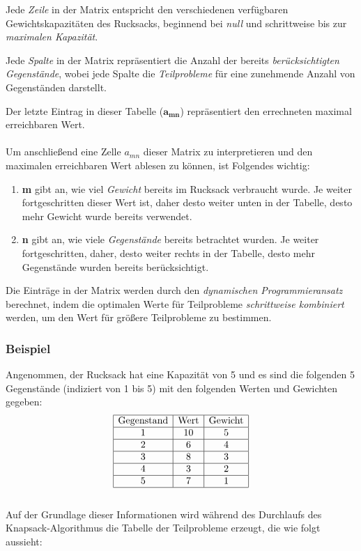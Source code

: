 Jede \textit{Zeile} in der Matrix entspricht den verschiedenen verfügbaren Gewichtskapazitäten des Rucksacks, beginnend
bei \textit{null} und schrittweise bis zur \textit{maximalen Kapazität}.

Jede \textit{Spalte} in der Matrix repräsentiert die Anzahl der bereits \textit{berücksichtigten Gegenstände}, wobei jede
Spalte die \textit{Teilprobleme} für eine zunehmende Anzahl von Gegenständen darstellt.

Der letzte Eintrag in dieser Tabelle (\textbf{$\mathbf{a_{mn}}$}) repräsentiert den errechneten maximal erreichbaren Wert.\\
\\
Um anschließend eine Zelle \( a_{mn} \) dieser Matrix zu interpretieren und den maximalen erreichbaren Wert ablesen zu können, ist Folgendes wichtig:
\begin{enumerate}
\item \textbf{m} gibt an, wie viel \textit{Gewicht} bereits im Rucksack verbraucht wurde. Je weiter fortgeschritten dieser
Wert ist, daher desto weiter unten in der Tabelle, desto mehr Gewicht wurde bereits verwendet.
\item \textbf{n} gibt an, wie viele \textit{Gegenstände} bereits betrachtet wurden. Je weiter fortgeschritten, daher,
desto weiter rechts in der Tabelle, desto mehr Gegenstände wurden bereits berücksichtigt.
\end{enumerate}

Die Einträge in der Matrix werden durch den \textit{dynamischen Programmieransatz} berechnet, indem die optimalen Werte für
Teilprobleme \textit{schrittweise kombiniert} werden, um den Wert für größere Teilprobleme zu bestimmen.

\subsubsection*{Beispiel}
Angenommen, der Rucksack hat eine Kapazität von 5 und es sind die folgenden 5 Gegenstände (indiziert von 1 bis 5) mit den folgenden Werten und Gewichten gegeben:
\[
\begin{array}{|c|c|c|}
\hline
\text{Gegenstand} & \text{Wert} & \text{Gewicht} \\
\hline
1 & 10 & 5 \\
\hline
2 & 6 & 4 \\
\hline
3 & 8 & 3 \\
\hline
4 & 3 & 2 \\
\hline
5 & 7 & 1 \\
\hline
\end{array}
\]
\\
Auf der Grundlage dieser Informationen wird während des Durchlaufs des Knapsack-Algorithmus die Tabelle der Teilprobleme erzeugt, die wie folgt aussieht:

